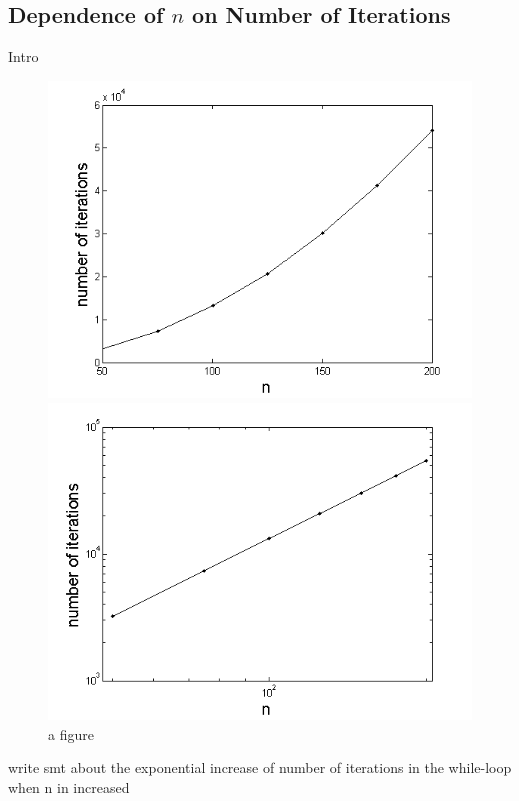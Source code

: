 \subsection{Dependence of $n$ on Number of Iterations}
\label{subsec:DependenceOnNumberOfIterations}

Intro

\begin{figure}[H]
\centering
\begin{minipage}{.5\textwidth}
  \centering
  \includegraphics[width=1\linewidth]{figures/NumberOfIterations.png}
\end{minipage}%
\begin{minipage}{.5\textwidth}
  \centering
  \includegraphics[width=1\linewidth]{figures/NumberOfIterationsloglog.png}
\end{minipage}
\caption{a figure}
\label{fig:DependenceOnNumberOfIterations1}
\end{figure}

write smt about the exponential increase of number of iterations in the while-loop when n in increased
